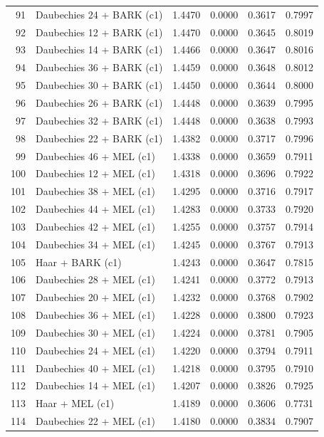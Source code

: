 \begin{longtable}{@{}rlrrrr@{}}
91 & Daubechies 24 + BARK (c1) & 1.4470 & 0.0000 & 0.3617 & 0.7997 \\
92 & Daubechies 12 + BARK (c1) & 1.4470 & 0.0000 & 0.3645 & 0.8019 \\
93 & Daubechies 14 + BARK (c1) & 1.4466 & 0.0000 & 0.3647 & 0.8016 \\
94 & Daubechies 36 + BARK (c1) & 1.4459 & 0.0000 & 0.3648 & 0.8012 \\
95 & Daubechies 30 + BARK (c1) & 1.4450 & 0.0000 & 0.3644 & 0.8000 \\
96 & Daubechies 26 + BARK (c1) & 1.4448 & 0.0000 & 0.3639 & 0.7995 \\
97 & Daubechies 32 + BARK (c1) & 1.4448 & 0.0000 & 0.3638 & 0.7993 \\
98 & Daubechies 22 + BARK (c1) & 1.4382 & 0.0000 & 0.3717 & 0.7996 \\
99 & Daubechies 46 + MEL (c1) & 1.4338 & 0.0000 & 0.3659 & 0.7911 \\
100 & Daubechies 12 + MEL (c1) & 1.4318 & 0.0000 & 0.3696 & 0.7922 \\
101 & Daubechies 38 + MEL (c1) & 1.4295 & 0.0000 & 0.3716 & 0.7917 \\
102 & Daubechies 44 + MEL (c1) & 1.4283 & 0.0000 & 0.3733 & 0.7920 \\
103 & Daubechies 42 + MEL (c1) & 1.4255 & 0.0000 & 0.3757 & 0.7914 \\
104 & Daubechies 34 + MEL (c1) & 1.4245 & 0.0000 & 0.3767 & 0.7913 \\
105 & Haar + BARK (c1) & 1.4243 & 0.0000 & 0.3647 & 0.7815 \\
106 & Daubechies 28 + MEL (c1) & 1.4241 & 0.0000 & 0.3772 & 0.7913 \\
107 & Daubechies 20 + MEL (c1) & 1.4232 & 0.0000 & 0.3768 & 0.7902 \\
108 & Daubechies 36 + MEL (c1) & 1.4228 & 0.0000 & 0.3800 & 0.7923 \\
109 & Daubechies 30 + MEL (c1) & 1.4224 & 0.0000 & 0.3781 & 0.7905 \\
110 & Daubechies 24 + MEL (c1) & 1.4220 & 0.0000 & 0.3794 & 0.7911 \\
111 & Daubechies 40 + MEL (c1) & 1.4218 & 0.0000 & 0.3795 & 0.7910 \\
112 & Daubechies 14 + MEL (c1) & 1.4207 & 0.0000 & 0.3826 & 0.7925 \\
113 & Haar + MEL (c1) & 1.4189 & 0.0000 & 0.3606 & 0.7731 \\
114 & Daubechies 22 + MEL (c1) & 1.4180 & 0.0000 & 0.3834 & 0.7907 \\

\end{longtable}
